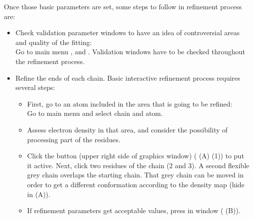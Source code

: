 \begin{itemize}
  Once those basic parameters are set, some steps to follow in refinement process are:\\
  \begin{itemize}
     \item Check validation parameter windows to have an idea of controversial areas and quality of the fitting:\\
     Go to \coot main menu ,  and . Validation windows have to be checked throughout the refinement process.\\
     \item Refine the ends of each chain. Basic interactive refinement process requires several steps:\\
      \begin{itemize}
      \item First, go to an atom included in the area that is going to be refined:\\
      Go to \coot main menu  and select chain and atom.\\
      \item Assess electron density in that area, and consider the possibility of processing part of the residues.\\
      \item Click the button  (upper right side of \coot graphics window)  ( (A) (1)) to put it active. Next, click two residues of the chain (2 and 3). A second flexible grey chain overlaps the starting chain. That grey chain can be moved in order to get a different conformation according to the density map (hide in  (A)).\\ 
      \item If refinement parameters get acceptable values, press  in  window ( (B)).\\
     

\end{itemize}
\end{itemize}
\end{itemize}
